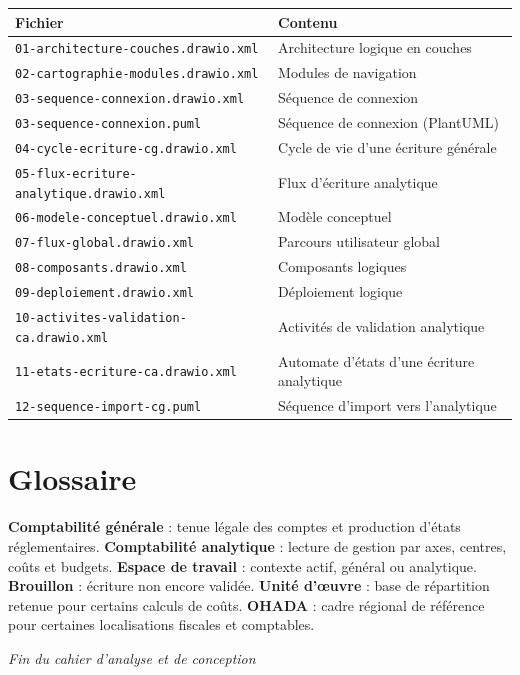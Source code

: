 \documentclass[12pt,a4paper]{report}
\begin{document}
\begin{longtable}{p{5.4cm}p{9cm}}
\hline
\textbf{Fichier} & \textbf{Contenu} \\
\hline
\endhead
\texttt{01-architecture-couches.drawio.xml} & Architecture logique en couches \\
\texttt{02-cartographie-modules.drawio.xml} & Modules de navigation \\
\texttt{03-sequence-connexion.drawio.xml} & Séquence de connexion \\
\texttt{03-sequence-connexion.puml} & Séquence de connexion (PlantUML) \\
\texttt{04-cycle-ecriture-cg.drawio.xml} & Cycle de vie d'une écriture générale \\
\texttt{05-flux-ecriture-analytique.drawio.xml} & Flux d'écriture analytique \\
\texttt{06-modele-conceptuel.drawio.xml} & Modèle conceptuel \\
\texttt{07-flux-global.drawio.xml} & Parcours utilisateur global \\
\texttt{08-composants.drawio.xml} & Composants logiques \\
\texttt{09-deploiement.drawio.xml} & Déploiement logique \\
\texttt{10-activites-validation-ca.drawio.xml} & Activités de validation analytique \\
\texttt{11-etats-ecriture-ca.drawio.xml} & Automate d'états d'une écriture analytique \\
\texttt{12-sequence-import-cg.puml} & Séquence d'import vers l'analytique \\
\hline
\end{longtable}

\section{Glossaire}

\textbf{Comptabilité générale} : tenue légale des comptes et production d'états réglementaires. \textbf{Comptabilité analytique} : lecture de gestion par axes, centres, coûts et budgets. \textbf{Espace de travail} : contexte actif, général ou analytique. \textbf{Brouillon} : écriture non encore validée. \textbf{Unité d'œuvre} : base de répartition retenue pour certains calculs de coûts. \textbf{OHADA} : cadre régional de référence pour certaines localisations fiscales et comptables.

\vspace{1.5cm}
\begin{center}
\textit{Fin du cahier d'analyse et de conception}
\end{center}
\end{document}
